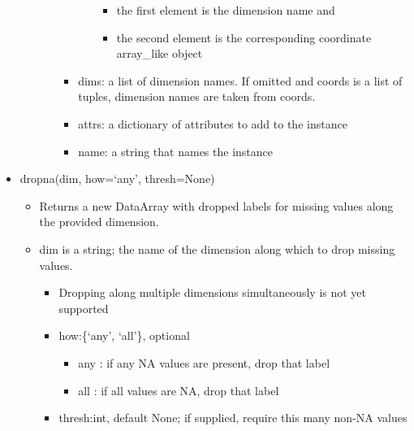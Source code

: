 \documentclass[11pt]{article}
\providecommand{\tightlist}{%
      \setlength{\itemsep}{0pt}\setlength{\parskip}{0pt}}
\begin{document}
\begin{itemize}
\begin{itemize}
\begin{itemize}
\begin{itemize}
\begin{itemize}
          \begin{itemize}
          \tightlist
          \item
            the first element is the dimension name and
          \item
            the second element is the corresponding coordinate
            array\_like object
          \end{itemize}
        \end{itemize}
      \item
        dims: a list of dimension names. If omitted and coords is a list
        of tuples, dimension names are taken from coords.
      \item
        attrs: a dictionary of attributes to add to the instance
      \item
        name: a string that names the instance
      \end{itemize}
    \end{itemize}
  \end{itemize}
\item
  dropna(dim, how=`any', thresh=None)

  \begin{itemize}
  \tightlist
  \item
    Returns a new DataArray with dropped labels for missing values along
    the provided dimension.
  \item
    dim is a string; the name of the dimension along which to drop
    missing values.

    \begin{itemize}
    \tightlist
    \item
      Dropping along multiple dimensions simultaneously is not yet
      supported
    \item
      how:\{`any', `all'\}, optional

      \begin{itemize}
      \tightlist
      \item
        any : if any NA values are present, drop that label
      \item
        all : if all values are NA, drop that label
      \end{itemize}
    \item
      thresh:int, default None; if supplied, require this many non-NA
      values
    \end{itemize}
  \end{itemize}
\end{itemize}
\end{document}
